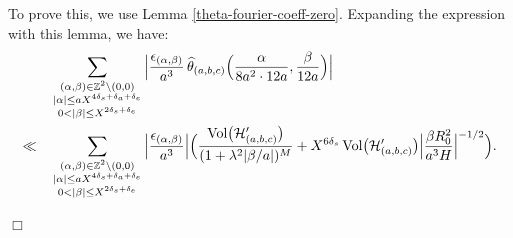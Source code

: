 \documentclass{article}
\def\Vol{{\rm Vol}}
\def\H{{\mathcal H}}
\def\H{{\mathcal H}}
\newenvironment{proof}{\noindent {\bf Proof:}}{$\Box$ \vspace{2 ex}}
\begin{document}
\begin{proof}
    To prove this, we use Lemma \ref{theta-fourier-coeff-zero}. Expanding the expression with this lemma, we have: \begin{align*} &\sum_{\substack{(\alpha, \beta) \in \mathbb{Z}^2 \backslash {(0, 0)} \\ |\alpha| \leq aX^{4\delta_s + \delta_a + \delta_e} \\ 0 < |\beta| \leq X^{2\delta_s + \delta_e}}} \Big| \frac{\epsilon_{(\alpha, \beta)}}{a^3} \, \widehat{\theta}_{(a, b, c)}\Big(\frac{\alpha}{8a^2 \cdot 12a}, \frac{\beta}{12a}\Big) \Big|\\  \ll\quad
&\sum_{\substack{(\alpha, \beta) \in \mathbb{Z}^2 \backslash {(0, 0)} \\|\alpha| \leq aX^{4\delta_s + \delta_a + \delta_e} \\ 0 < |\beta| \leq X^{2\delta_s + \delta_e}}} \Big|\frac{\epsilon_{(\alpha, \beta)}}{a^3}\Big| \Big( \frac{\Vol\big(\H'_{(a,b,c)}\big)}{(1 + \lambda^2 |\beta / a|)^M} + X^{6\delta_s} \, \Vol\big(\H'_{(a,b,c)}\big)\Big|\frac{\beta R_0^2}{a^3 H}\Big|^{-1/2} \Big). \end{align*}


\end{proof}
\end{document}
